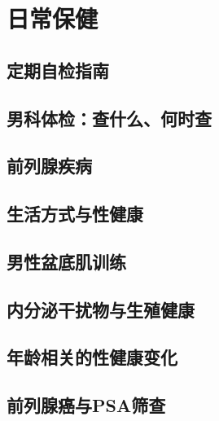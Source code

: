 \chapter{日常保健}

\section{定期自检指南}

\section{男科体检：查什么、何时查}

\section{前列腺疾病}

\section{生活方式与性健康}

\section{男性盆底肌训练}

\section{内分泌干扰物与生殖健康}

\section{年龄相关的性健康变化}

\section{前列腺癌与PSA筛查}

